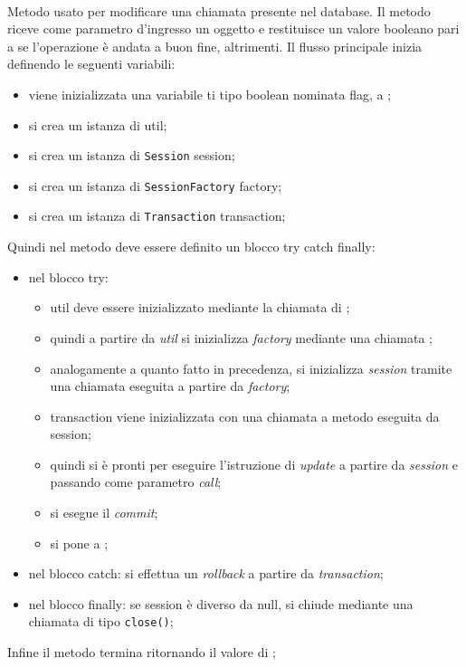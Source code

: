 \begin{description}
	\item{}\\
	Metodo usato per modificare una chiamata presente nel database. Il metodo riceve come parametro d'ingresso un oggetto  e restituisce un valore booleano  pari a  se l'operazione è andata a buon fine,  altrimenti. Il flusso principale inizia definendo le seguenti variabili:
	\begin{itemize}
		\item viene inizializzata una variabile ti tipo boolean nominata flag, a ;
		\item si crea un istanza di  util;
		\item si crea un istanza di \texttt{Session} session;
		\item si crea un istanza di \texttt{SessionFactory} factory;
		\item si crea un istanza di \texttt{Transaction} transaction;
	\end{itemize}
	Quindi nel metodo deve essere definito un blocco try catch finally:
	\begin{itemize}
		\item nel blocco try:
		\begin{itemize}
			\item util deve essere inizializzato mediante la chiamata  di ;
			\item quindi a partire da \textit{util} si inizializza \textit{factory} mediante una chiamata ;
			\item analogamente a quanto fatto in precedenza, si inizializza \textit{session} tramite una chiamata  eseguita a partire da \textit{factory};
			\item transaction viene inizializzata con una chiamata a metodo  eseguita da session;
			\item quindi si è pronti per eseguire l'istruzione di \textit{update} a partire da \textit{session} e passando come parametro \textit{call};
			\item si esegue il \textit{commit};
			\item si pone  a ;
		\end{itemize}
		\item nel blocco catch: si effettua un \textit{rollback} a partire da \textit{transaction};
		\item nel blocco finally: se session è diverso da null, si chiude mediante una chiamata di tipo \texttt{close()};
	\end{itemize}
	Infine il metodo termina ritornando il valore di ;	
	

\end{description}
